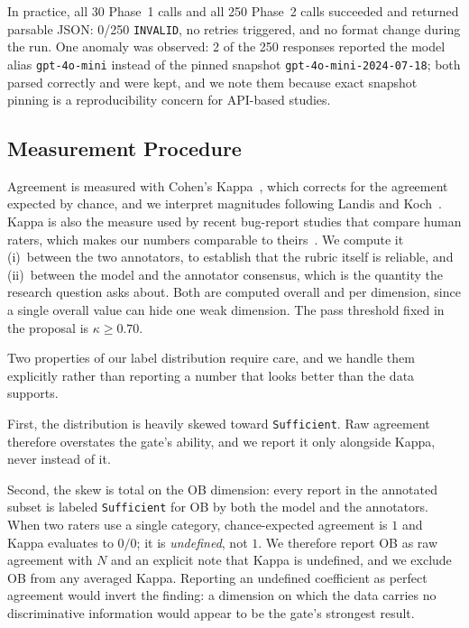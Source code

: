 In practice, all 30 Phase~1 calls and all 250 Phase~2 calls succeeded
and returned parsable JSON: 0/250 \texttt{INVALID}, no retries
triggered, and no format change during the run. One anomaly was
observed: 2 of the 250 responses reported the model alias
\texttt{gpt-4o-mini} instead of the pinned snapshot
\texttt{gpt-4o-mini-2024-07-18}; both parsed correctly and were kept,
and we note them because exact snapshot pinning is a reproducibility
concern for API-based studies.

\subsection{Measurement Procedure}
\label{sec:method:metrics}

Agreement is measured with Cohen's Kappa~\cite{cohen1960}, which
corrects for the agreement expected by chance, and we interpret
magnitudes following Landis and Koch~\cite{landis1977}. Kappa is also
the measure used by recent bug-report studies that compare human
raters, which makes our numbers comparable to
theirs~\cite{mahmud2025astrobr,akyol2026improbr}. We compute it
(i)~between the two annotators, to establish that the rubric itself is
reliable, and (ii)~between the model and the annotator consensus, which
is the quantity the research question asks about. Both are computed
overall and per dimension, since a single overall value can hide one
weak dimension. The pass threshold fixed in the proposal is
$\kappa \geq 0.70$.

Two properties of our label distribution require care, and we handle
them explicitly rather than reporting a number that looks better than
the data supports.

First, the distribution is heavily skewed toward \texttt{Sufficient}.
Raw agreement therefore overstates the gate's ability, and we report it
only alongside Kappa, never instead of it.

Second, the skew is total on the OB dimension: every report in the
annotated subset is labeled \texttt{Sufficient} for OB by both the
model and the annotators. When two raters use a single category,
chance-expected agreement is $1$ and Kappa evaluates to $0/0$; it is
\emph{undefined}, not $1$. We therefore report OB as raw agreement with
$N$ and an explicit note that Kappa is undefined, and we exclude OB
from any averaged Kappa. Reporting an undefined coefficient as perfect
agreement would invert the finding: a dimension on which the data
carries no discriminative information would appear to be the gate's
strongest result.

